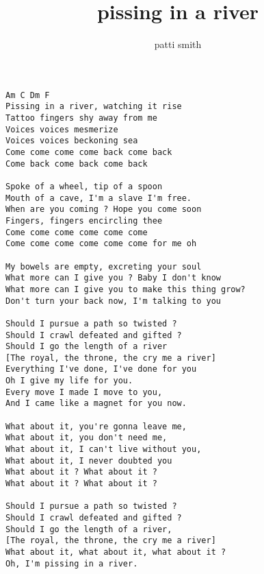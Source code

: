 \author{patti smith}
\title{pissing in a river}
\maketitle
\begin{verbatim}
Am C Dm F
Pissing in a river, watching it rise
Tattoo fingers shy away from me
Voices voices mesmerize
Voices voices beckoning sea
Come come come come back come back
Come back come back come back

Spoke of a wheel, tip of a spoon
Mouth of a cave, I'm a slave I'm free.
When are you coming ? Hope you come soon
Fingers, fingers encircling thee
Come come come come come come
Come come come come come come for me oh

My bowels are empty, excreting your soul
What more can I give you ? Baby I don't know
What more can I give you to make this thing grow?
Don't turn your back now, I'm talking to you

Should I pursue a path so twisted ?
Should I crawl defeated and gifted ?
Should I go the length of a river
[The royal, the throne, the cry me a river]
Everything I've done, I've done for you
Oh I give my life for you.
Every move I made I move to you,
And I came like a magnet for you now.

What about it, you're gonna leave me,
What about it, you don't need me,
What about it, I can't live without you,
What about it, I never doubted you
What about it ? What about it ?
What about it ? What about it ?

Should I pursue a path so twisted ?
Should I crawl defeated and gifted ?
Should I go the length of a river,
[The royal, the throne, the cry me a river]
What about it, what about it, what about it ?
Oh, I'm pissing in a river. 
\end{verbatim}